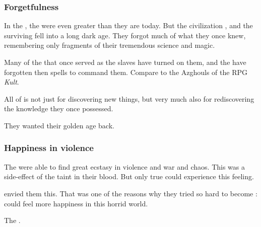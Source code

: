 \subsubsection{Forgetfulness}
In the ,
the \dragons{} were even greater than they are today. 
But the \ophidian{} civilization , and the surviving \ophidians{} fell into a long dark age. 
They forgot much of what they once knew, remembering only fragments of their tremendous science and magic.  

Many of the \daemons{} that once served as the \psp{\dragons}{} slaves have turned on them, and the \dragons{} have forgotten then spells to command them. 
Compare to the Azghouls of the RPG \emph{Kult}. 

All of  is not just for discovering new things, but very much also for rediscovering the knowledge they once possessed. 

They wanted their golden age back.






\subsubsection{Happiness in violence}
The \dragons were able to find great ecstasy in violence and war and chaos.
This was a side-effect of the \xs taint in their blood.
But only true \dragons could experience this feeling.

\Caisith envied them this. 
That was one of the reasons why they tried so hard to become \dragons:
\Dragons could feel more happiness in this horrid world.

The \resphan \ketherain {}. 





